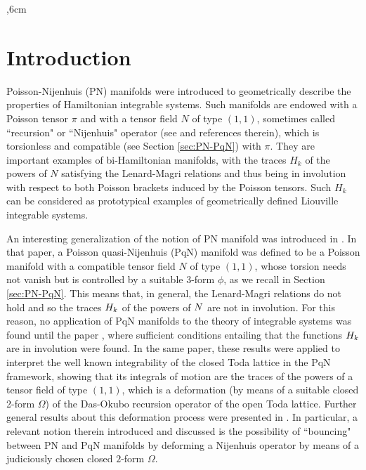 \documentclass[12pt]{article}
\begin{document}
,6cm

\section{Introduction}
Poisson-Nijenhuis (PN) manifolds \cite{MagriMorosiRagnisco85,KM} were introduced to geometrically describe 
the properties of Hamiltonian integrable systems. Such manifolds are endowed with a Poisson tensor $\pi$ 
and with a tensor field $N$ of type $(1,1)$, sometimes called ``recursion" or ``Nijenhuis" operator (see \cite{BKM2022} and references therein),
which is torsionless and compatible (see Section \ref{sec:PN-PqN}) with %
$\pi$. They are important examples of bi-Hamiltonian manifolds, with the traces $H_k$ of the powers 
of $N$ satisfying the Lenard-Magri relations and thus being in involution with respect to both Poisson brackets induced by the Poisson tensors. Such $H_k$ %
can be considered as prototypical examples of geometrically defined Liouville integrable systems.

An interesting generalization of the notion of PN manifold was introduced in \cite{SX}. In that paper, a Poisson quasi-Nijenhuis (PqN) manifold was defined to be a Poisson manifold with a compatible tensor field $%
N$ of type $(1,1)$, whose torsion needs not vanish but is controlled by a suitable 3-form $\phi$, as we recall in Section \ref{sec:PN-PqN}. 
This means that, in general, the Lenard-Magri relations do not hold and so the traces ${%
H}_k$ of the powers of ${%
N}$ are not in involution.
For this reason, no application of PqN manifolds to the theory of %
integrable systems was found until the paper \cite{FMOP2020}, where %
sufficient conditions
entailing that the functions ${%
H}_k$ are in involution were found.
In the same paper, these results were applied to interpret the well known integrability of the closed Toda lattice in the PqN framework, showing that its integrals of motion are the traces of the powers of a tensor field %
of type $(1,1)$, which is a deformation (by means of a suitable closed 2-form $\Omega$) 
of the Das-Okubo recursion operator \cite{DO} %
of the open Toda lattice. 
Further general results about this deformation process were presented in \cite{FMP2023,DMP2024}.
In particular, a relevant notion therein introduced and discussed is the possibility of  ``bouncing" between PN and PqN manifolds by deforming a Nijenhuis operator by means of a judiciously chosen closed $2$-form $\Omega$.
\end{document}
